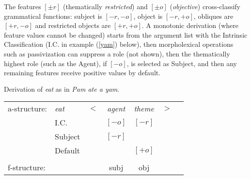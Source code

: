 \begin{sloppypar}
\noindent  
The features $[\pm r]$ (thematically \textit{restricted}) and $[\pm o]$ (\textit{objective}) cross-classify grammatical functions: subject is $[-r, -o]$, object is $[-r, +o]$, obliques are $[+r, -o]$ and
restricted objects are $[+r, +o]$.   A monotonic derivation (where feature values cannot be changed) starts from the argument list with the Intrinsic Classification (I.C. in example  (\ref{yam}) below), then morpholexical operations such as passivization can suppress a role (not shown), then the thematically highest role (such as the Agent), if $[-o]$, is selected as Subject, %
and then any remaining features receive positive values by default.
\end{sloppypar}

 \begin{exe}
\ex\label{yam}{Derivation of \textit{eat} as in \textit{Pam ate a yam}.\\
\begin{tabular}[t]{@{}lllccll}
a-structure: &{\it eat}& $<$& \textit{agent} & \textit{theme}   & $>$ & \\
             & I.C.      &    & $[-o]$ & $[-r]$   &   & \\
             &  Subject     &    & $[-r]$ &            &              & \\
             &  Default     &    &     & $[+o]$   &   & \\
             &       &    &\vline    & \vline &    & \\
f-structure: &       &    &{\sc subj} &{\sc obj}  &   &
\end{tabular}
  }
\end{exe}

